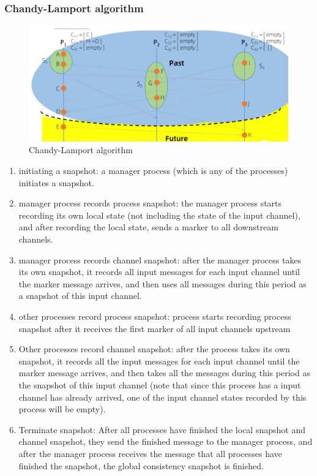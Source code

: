 \documentclass[acmlarge]{acmart}
\begin{document}
\subsubsection{Chandy-Lamport algorithm}
\begin{figure}[h]
  \centering
  \includegraphics[width=\linewidth]{./chandy-lamport.png}
  \caption{Chandy-Lamport algorithm}
\end{figure}
\begin{enumerate}
  \item initiating a snapshot: a manager process (which is any of the processes) initiates a snapshot.
  \item manager process records process snapshot: the manager process starts recording its own local state (not including the state of the input channel), and after recording the local state, sends a marker to all downstream channels.
  \item manager process records channel snapshot: after the manager process takes its own snapshot, it records all input messages for each input channel until the marker message arrives, and then uses all messages during this period as a snapshot of this input channel.
  \item other processes record process snapshot: process starts recording process snapshot after it receives the first marker of all input channels upstream
  \item Other processes record channel snapshot: after the process takes its own snapshot, it records all the input messages for each input channel until the marker message arrives, and then takes all the messages during this period as the snapshot of this input channel (note that since this process has a input channel has already arrived, one of the input channel states recorded by this process will be empty).
  \item Terminate snapshot: After all processes have finished the local snapshot and channel snapshot, they send the finished message to the manager process, and after the manager process receives the message that all processes have finished the snapshot, the global consistency snapshot is finished.
  
\end{enumerate}
\end{document}
